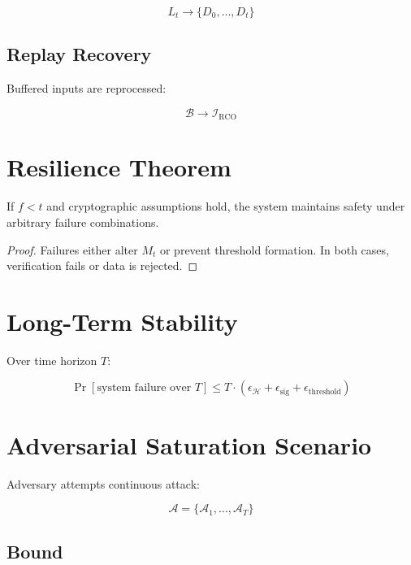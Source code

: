 \begin{equation}
L_t \rightarrow \{D_0, \dots, D_t\}
\end{equation}

\subsection{Replay Recovery}

Buffered inputs are reprocessed:

\begin{equation}
\mathcal{B} \rightarrow \mathcal{I}_{\text{RCO}}
\end{equation}

\section{Resilience Theorem}

\begin{theorem}
If $f < t$ and cryptographic assumptions hold, the system maintains safety under arbitrary failure combinations.
\end{theorem}

\begin{proof}
Failures either alter $M_t$ or prevent threshold formation. In both cases, verification fails or data is rejected.
\end{proof}

\section{Long-Term Stability}

Over time horizon $T$:

\begin{equation}
\Pr[\text{system failure over } T] \leq T \cdot (\epsilon_{\mathcal{H}} + \epsilon_{\text{sig}} + \epsilon_{\text{threshold}})
\end{equation}

\section{Adversarial Saturation Scenario}

Adversary attempts continuous attack:

\begin{equation}
\mathcal{A} = \{\mathcal{A}_1, \dots, \mathcal{A}_T\}
\end{equation}

\subsection{Bound}


